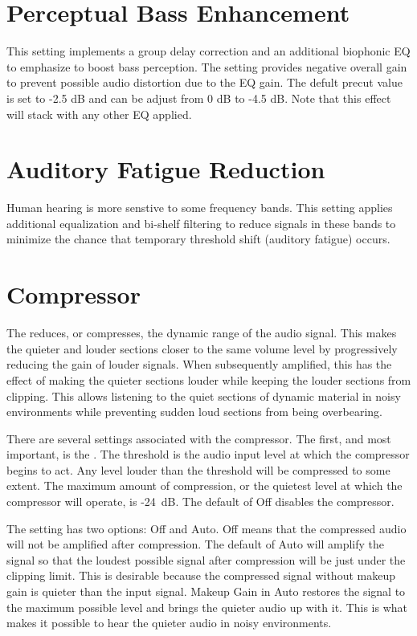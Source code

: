 \section{Perceptual Bass Enhancement}
This setting implements a group delay correction and an additional biophonic EQ to
emphasize to boost bass perception. The  setting provides
negative overall gain to prevent possible audio distortion due to the EQ
gain.  The defult precut value is set to -2.5 dB and can be adjust from 0 dB to -4.5 dB.
Note that this effect will stack with any other EQ applied.

\section{Auditory Fatigue Reduction}
Human hearing is more senstive to some frequency bands. This setting applies additional
equalization and bi-shelf filtering to reduce signals in these bands to minimize
the chance that temporary threshold shift (auditory fatigue) occurs.

\section{Compressor}
The  reduces, or compresses, the dynamic range of the audio
signal.  This makes the quieter and louder sections closer to the same volume
level by progressively reducing the gain of louder signals.  When subsequently
amplified, this has the effect of making the quieter sections louder while
keeping the louder sections from clipping.  This allows listening to the quiet
sections of dynamic material in noisy environments while preventing sudden loud
sections from being overbearing.

There are several settings associated with the compressor.  The first, and most
important, is the .  The threshold is the audio input level
at which the compressor begins to act.  Any level louder than the threshold
will be compressed to some extent.  The maximum amount of compression, or the
quietest level at which the compressor will operate, is -24~dB.  The default of
Off disables the compressor.

The  setting has two options: Off and Auto.  Off means
that the compressed audio will not be amplified after compression.  The default
of Auto will amplify the signal so that the loudest possible signal after
compression will be just under the clipping limit.  This is desirable because
the compressed signal without makeup gain is quieter than the input signal.
Makeup Gain in Auto restores the signal to the maximum possible level and
brings the quieter audio up with it.  This is what makes it possible to hear
the quieter audio in noisy environments.

